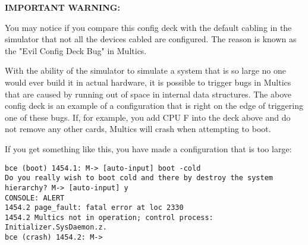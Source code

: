 \textbf{IMPORTANT WARNING:}

You may notice if you compare this config deck with the default cabling in the simulator that
not all the devices cabled are configured. The reason is known as the "Evil Config Deck Bug" in
Multics.

With the ability of the simulator to simulate a system that is so large no one would ever build
it in actual hardware, it is possible to trigger bugs in Multics that are caused by running out
of space in internal data structures. The above config deck is an example of a configuration that
is right on the edge of triggering one of these bugs. If, for example, you add CPU F into the deck
above and do not remove any other cards, Multics will crash when attempting to boot.

If you get something like this, you have made a configuration that is too large:

\begin{adjustwidth}{5ex}{1ex}
    \texttt{bce (boot) 1454.1: M-> [auto-input] boot -cold} \\
    \texttt{Do you really wish to boot cold and there by destroy the system hierarchy? M-> [auto-input] y} \\
    \texttt{CONSOLE: ALERT} \\
    \texttt{1454.2  page\_fault: fatal error at loc 2330} \\
    \texttt{1454.2  Multics not in operation; control process: Initializer.SysDaemon.z.} \\
    \texttt{bce (crash) 1454.2: M->} \\
\end{adjustwidth}  

